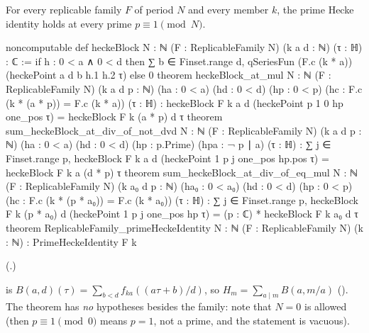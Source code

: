 \begin{theorem}\label{ch19:thm:primehecke}
For every replicable family $F$ of period $N$ and every member $k$, the prime Hecke identity holds at every prime
$p\equiv1\pmod N$.
\end{theorem}
\begin{leancode}
noncomputable def heckeBlock {N : ℕ} (F : ReplicableFamily N) (k a d : ℕ) (τ : ℍ) : ℂ :=
  if h : 0 < a ∧ 0 < d then
    ∑ b ∈ Finset.range d, qSeriesFun (F.c (k * a)) (heckePoint a d b h.1 h.2 τ)
  else 0
theorem heckeBlock_at_mul {N : ℕ} (F : ReplicableFamily N) (k a d p : ℕ) (ha : 0 < a)
    (hd : 0 < d) (hp : 0 < p) (hc : F.c (k * (a * p)) = F.c (k * a)) (τ : ℍ) :
    heckeBlock F k a d (heckePoint p 1 0 hp one_pos τ) = heckeBlock F k (a * p) d τ
theorem sum_heckeBlock_at_div_of_not_dvd {N : ℕ} (F : ReplicableFamily N) (k a d p : ℕ)
    (ha : 0 < a) (hd : 0 < d) (hp : p.Prime) (hpa : ¬ p ∣ a) (τ : ℍ) :
    ∑ j ∈ Finset.range p, heckeBlock F k a d (heckePoint 1 p j one_pos hp.pos τ) =
      heckeBlock F k a (d * p) τ
theorem sum_heckeBlock_at_div_of_eq_mul {N : ℕ} (F : ReplicableFamily N) (k a₀ d p : ℕ)
    (ha₀ : 0 < a₀) (hd : 0 < d) (hp : 0 < p) (hc : F.c (k * (p * a₀)) = F.c (k * a₀)) (τ : ℍ) :
    ∑ j ∈ Finset.range p, heckeBlock F k (p * a₀) d (heckePoint 1 p j one_pos hp τ) =
      (p : ℂ) * heckeBlock F k a₀ d τ
theorem ReplicableFamily_primeHeckeIdentity {N : ℕ} (F : ReplicableFamily N) (k : ℕ) :
    PrimeHeckeIdentity F k
\end{leancode}
(.)
\begin{dictionary}
 is $B(a,d)(\tau)=\sum_{b<d}f_{ka}((a\tau+b)/d)$, so $H_m=\sum_{a\mid m}B(a,m/a)$
().  The theorem has \emph{no} hypotheses besides the family: note that $N=0$ is allowed
(then $p\equiv1\pmod0$ means $p=1$, not a prime, and the statement is vacuous).
\end{dictionary}
